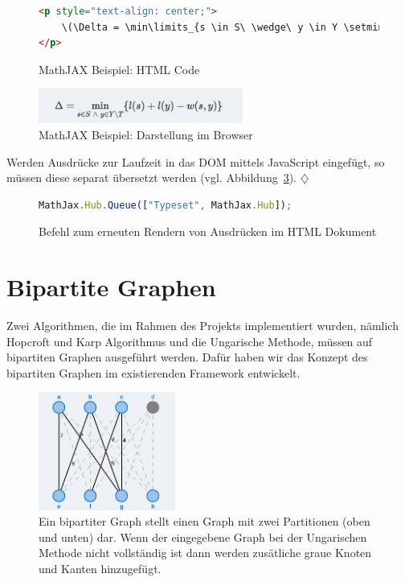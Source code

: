 \begin{figure}[h!]
\begin{lstlisting}[language=HTML]
<p style="text-align: center;">
	\(\Delta = \min\limits_{s \in S\ \wedge\ y \in Y \setminus T}\{l(s) + l(y) - w(s,y)\}\)
</p>
\end{lstlisting}
\caption[MathJAX: Beispiel Code]{MathJAX Beispiel: HTML Code}\label{fig:listing-mathjax-example-html}
\end{figure}

\begin{figure}[h!]
	\centering
	\includegraphics[width=0.6\textwidth]{figures/mathjax-example}
	\caption[MathJAX: Beispiel im Browser]{MathJAX Beispiel: Darstellung im Browser}\label{fig:mathjax-example-img}
\end{figure}

Werden Ausdrücke zur Laufzeit in das DOM mittels JavaScript eingefügt, so müssen diese separat übersetzt werden (vgl. Abbildung~\ref{fig:listing-mathjax-render}). \hfill$\diamondsuit$

\begin{figure}[h!]
\begin{lstlisting}[language=JavaScript]
MathJax.Hub.Queue(["Typeset", MathJax.Hub]);
\end{lstlisting}
\caption[MathJAX: Render Befehl]{Befehl zum erneuten Rendern von Ausdrücken im HTML Dokument}\label{fig:listing-mathjax-render}
\end{figure}

\section{Bipartite Graphen} %
Zwei Algorithmen, die im Rahmen des Projekts implementiert wurden, nämlich Hopcroft und Karp Algorithmus und die Ungarische Methode, müssen auf bipartiten Graphen ausgeführt werden. Dafür haben wir das Konzept des bipartiten Graphen im existierenden Framework entwickelt. 

\begin{figure}[h!]
	\centering
	\includegraphics[width=0.4\textwidth]{figures/hungarian-bipartite}
	\caption[Bipartiter Graph]{Ein bipartiter Graph stellt einen Graph mit zwei Partitionen (oben und unten) dar. Wenn der eingegebene Graph bei der Ungarischen Methode nicht vollständig ist dann werden zusätliche graue Knoten und Kanten hinzugefügt.}\label{fig:hungarian-bipartite}
\end{figure}

